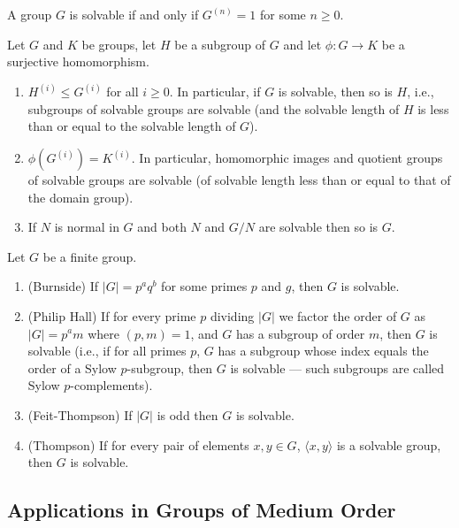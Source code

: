 \documentclass[../main]{subfiles}
\begin{document}
\begin{thm}
 A group $G$ is solvable if and only if $G^{(n)} = 1$ for some $n \geq 0$. 
\end{thm}


\begin{prop}
 Let $G$ and $K$ be groups, let $H$ be a subgroup of $G$ and let $\phi \colon G \to K$ be a surjective homomorphism.
 \begin{enumerate}
  \item $H^{(i)} \leq G^{(i)}$ for all $i \geq 0$. In particular, if $G$ is solvable, then so is $H$, i.e., subgroups of solvable groups are solvable (and the solvable length  of $H$ is less than or equal to the solvable length of $G$).
  
  \item $\phi(G^{(i)}) = K^{(i)}$. In particular, homomorphic images and quotient groups of solvable groups are solvable (of solvable length less than or equal to that of the domain group).
  
  \item If $N$ is normal in $G$ and both $N$ and $G/N$ are solvable then so is $G$. 
 \end{enumerate}
\end{prop}


\begin{thm}
 Let $G$ be a finite group. 
 \begin{enumerate}
  \item (Burnside) If $|G| = p^a q^b$ for some primes $p$ and $g$, then $G$ is solvable.
  
  \item (Philip Hall) If for every prime $p$ dividing $|G|$ we factor the order of $G$ as $|G| = p^a m$ where $(p,m) = 1$, and $G$ has a subgroup of order $m$, then $G$ is solvable (i.e., if for all primes $p$, $G$ has a subgroup whose index equals the order of a Sylow $p$-subgroup, then $G$ is solvable --- such subgroups are called Sylow $p$-complements).
  
  \item (Feit-Thompson) If $|G|$ is odd then $G$ is solvable.
  
  \item (Thompson) If for every pair of elements $x,y \in G$, $\langle x,y \rangle$ is a solvable group, then $G$ is solvable.
 \end{enumerate}
\end{thm}


\subsection{Applications in Groups of Medium Order}
\end{document}
